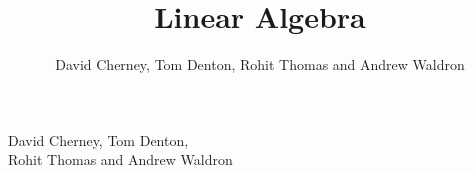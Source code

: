 \documentclass[12pt]{book}
\title{Linear Algebra}
\author{David Cherney, Tom Denton, Rohit Thomas and Andrew Waldron}
\date{}
\begin{document}
\thispagestyle{empty}

\vspace*{\fill}

\begin{center}\sffamily

\scalebox{2.2}{\Huge Linear Algebra}\vspace{.5in}


{\Large David Cherney, Tom Denton,\\\medskip
Rohit Thomas and Andrew Waldron}

\end{center}

\vspace{\fill}
\end{document}
